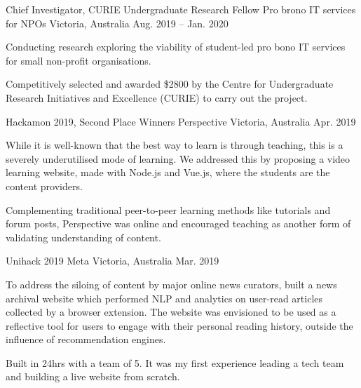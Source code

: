 \begin{cventries}
\cventry
    {Chief Investigator, CURIE Undergraduate Research Fellow}
    {Pro brono IT services for NPOs}
    {Victoria, Australia}
    {Aug. 2019 – Jan. 2020}
    {
      \begin{cvitems}
        \item {Conducting research exploring the viability of student-led pro bono IT services for small non-profit organisations.}
        \item {Competitively selected and awarded \$2800 by the Centre for Undergraduate Research Initiatives and Excellence (CURIE) to carry out the project.}
      \end{cvitems}
    }
\cventry
    {Hackamon 2019, Second Place Winners}
    {Perspective}
    {Victoria, Australia}
    {Apr. 2019}
    {
      \begin{cvitems}
        \item {While it is well-known that the best way to learn is through teaching, this is a severely underutilised mode of learning. We addressed this by proposing a video learning website, made with Node.js and Vue.js, where the students are the content providers.}
        \item {Complementing traditional peer-to-peer learning methods like tutorials and forum posts, Perspective was online and encouraged teaching as another form of validating understanding of content.}
      \end{cvitems}
    }
  \cventry
    {Unihack 2019}
    {Meta}
    {Victoria, Australia}
    {Mar. 2019}
    {
      \begin{cvitems}
        \item {To address the siloing of content by major online news curators, built a news archival website which performed NLP and analytics on user-read articles collected by a browser extension. The website was envisioned to be used as a reflective tool for users to engage with their personal reading history, outside the influence of recommendation engines.}
        \item {Built in 24hrs with a team of 5. It was my first experience leading a tech team and building a live website from scratch.}
      \end{cvitems}
    }
\end{cventries}
